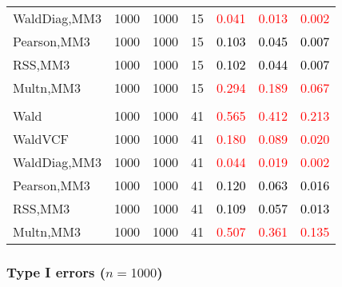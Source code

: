 \documentclass[
]{article}
\begin{document}
\begin{table}[H]
{\begin{tabular}[t]{lrrrrrr}
\hspace{1em}WaldDiag,MM3 & 1000 & 1000 & 15 & \textcolor{red}{0.041} & \textcolor{red}{0.013} & \textcolor{red}{0.002}\\
\hspace{1em}Pearson,MM3 & 1000 & 1000 & 15 & \textcolor{black}{0.103} & \textcolor{black}{0.045} & \textcolor{black}{0.007}\\
\hspace{1em}RSS,MM3 & 1000 & 1000 & 15 & \textcolor{black}{0.102} & \textcolor{black}{0.044} & \textcolor{black}{0.007}\\
\hspace{1em}Multn,MM3 & 1000 & 1000 & 15 & \textcolor{red}{0.294} & \textcolor{red}{0.189} & \textcolor{red}{0.067}\\
\addlinespace[0.3em]
\multicolumn{7}{l}{\textbf{3F 15V}}\\
\hspace{1em}Wald & 1000 & 1000 & 41 & \textcolor{red}{0.565} & \textcolor{red}{0.412} & \textcolor{red}{0.213}\\
\hspace{1em}WaldVCF & 1000 & 1000 & 41 & \textcolor{red}{0.180} & \textcolor{red}{0.089} & \textcolor{red}{0.020}\\
\hspace{1em}WaldDiag,MM3 & 1000 & 1000 & 41 & \textcolor{red}{0.044} & \textcolor{red}{0.019} & \textcolor{red}{0.002}\\
\hspace{1em}Pearson,MM3 & 1000 & 1000 & 41 & \textcolor{black}{0.120} & \textcolor{black}{0.063} & \textcolor{black}{0.016}\\
\hspace{1em}RSS,MM3 & 1000 & 1000 & 41 & \textcolor{black}{0.109} & \textcolor{black}{0.057} & \textcolor{black}{0.013}\\
\hspace{1em}Multn,MM3 & 1000 & 1000 & 41 & \textcolor{red}{0.507} & \textcolor{red}{0.361} & \textcolor{red}{0.135}\\
\bottomrule
\end{tabular}}
\endgroup{}
\end{table}

\hypertarget{type-i-errors-n1000-3}{%
\subsubsection{\texorpdfstring{Type I errors
(\(n=1000\))}{Type I errors (n=1000)}}\label{type-i-errors-n1000-3}}
\end{document}
